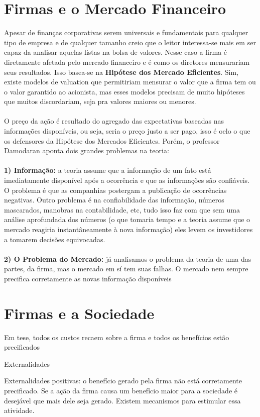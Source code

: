 \section{Firmas e o Mercado Financeiro}
Apesar de finanças corporativas serem universais e fundamentais para qualquer tipo de empresa e de qualquer tamanho creio que o leitor interessa-se mais em ser capaz da analisar aquelas listas na bolsa de valores. Nesse caso a firma é diretamente afetada pelo mercado financeiro e é como os diretores mensurariam seus resultados. Isso basea-se na \textbf{Hipótese dos Mercado Eficientes}. Sim, existe modelos de valuation que permitiriam mensurar o valor que a firma tem ou o valor garantido ao acionista, mas esses modelos precisam de muito hipóteses que muitos discordariam, seja pra valores maiores ou menores.
\\~\\
O preço da ação é resultado do agregado das expectativas baseadas nas informações disponíveis, ou seja, seria o preço justo a ser pago, isso é oelo o que os defensores da Hipótese dos Mercados Eficientes. Porém, o professor Damodaran aponta dois grandes problemas na teoria:
\\~\\
\textbf{1) Informação:} a teoria assume que a informação de um fato está imediatamente disponível após a ocorrência e que as informações são confiáveis. O problema é que as companhias postergam a publicação de ocorrências negativas. Outro problema é na confiabilidade das informação, números mascarados, manobras na contabilidade, etc, tudo isso faz com que sem uma análise aprofundada dos números (o que tomaria tempo e a teoria assume que o mercado reagiria instantâneamente à nova informação) eles levem os investidores a tomarem decisões equivocadas.
\\~\\
\textbf{2) O Problema do Mercado:} já analisamos o problema da teoria de uma das partes, da firma, mas o mercado em sí tem suas falhas. O mercado nem sempre precifica corretamente as novas informação disponíveis 

\section{Firmas e a Sociedade}
Em tese, todos os custos recaem sobre a firma e todos os benefícios estão precificados

Externalidades

Externalidades positivas: o benefício gerado pela firma não está corretamente precificado. Se a ação da firma causa um benefício maior para a sociedade é desejável que mais dele seja gerado. Existem mecanismos para estimular essa atividade. 

